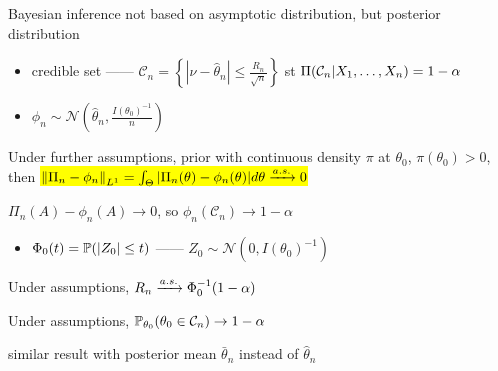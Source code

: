 \begin{fact}
    Bayesian inference not based on asymptotic distribution, but posterior distribution
\end{fact}

\begin{itemize}
    \item credible set ------ $\mathcal{C}_n = \left\{ |\nu - \hat{\theta}_n| \leq \frac{R_n}{\sqrt{n}} \right\}$ st $\Pi(\mathcal{C}_n|\ddd{X}) = 1 - \alpha$
    \item $\phi_n \sim \mathcal{N}\left(\hat \theta_n, \frac{I(\theta_0)^{-1}}{n}\right)$
\end{itemize}

\begin{thm}
    Under further assumptions, prior with continuous density $\pi$ at $\theta_0$, $\pi(\theta_0) > 0$, then
    \hl{$\left\lVert\Pi_n - \phi_n\right\rVert_{L^1} = \int_\Theta |\Pi_n(\theta) - \phi_n(\theta)|d\theta \xrightarrow{a.s.} 0$}
\end{thm}

\begin{fact}
    $\Pi_n(A) - \phi_n(A) \rightarrow 0$, so $\phi_n(\mathcal{C}_n) \rightarrow 1 - \alpha$
\end{fact}

\begin{itemize}
    \item $\Phi_0(t) = \mathbb{P}(|Z_0| \leq t)$ ------ $Z_0 \sim \mathcal{N}(0, I(\theta_0)^{-1})$
\end{itemize}

\begin{lemma}
    Under assumptions, $R_n \xrightarrow{a.s.} \Phi_0^{-1}(1 - \alpha)$
\end{lemma}

\begin{thm}
    Under assumptions, $\mathbb{P}_{\theta_0}(\theta_0 \in \mathcal{C}_n) \rightarrow 1 - \alpha$
\end{thm}

\begin{fact}
    similar result with posterior mean $\bar \theta_n$ instead of $\hat \theta_n$
\end{fact}
